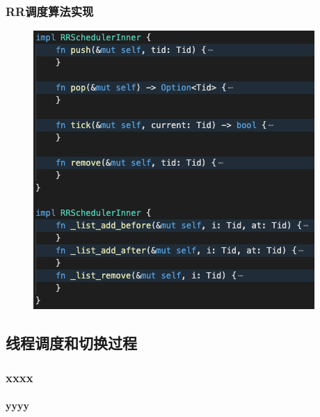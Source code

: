 % 
% 
% 
\begin{frame}[fragile]
    \frametitle{RR调度算法实现}
    \begin{figure}
    \includegraphics[width=0.45\linewidth]{figs/RRSchedulerInner.png}
    \end{figure}
\end{frame}
% 
% 
% 
\subsection{线程调度和切换过程} %
\begin{frame}[fragile]
    \frametitle{xxxx}
    \framesubtitle{yyyy}
\end{frame}

